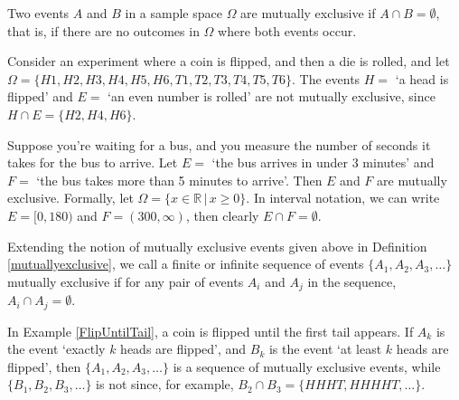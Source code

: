 \begin{definition}\label{mutuallyexclusive}
Two events $A$ and $B$ in a sample space $\Omega$ are mutually exclusive if $A \cap B = \emptyset$, that is, if there are no outcomes in $\Omega$ where both events occur.
\end{definition}
\begin{examp}
Consider an experiment where a coin is flipped, and then a die is rolled, and let $\Omega = \{H1,H2,H3,H4,H5,H6,T1,T2,T3,T4,T5,T6\}$. The events $H =$ `a head is flipped' and $E =$ `an even number is rolled' are not mutually exclusive, since $H \cap E = \{H2, H4, H6\}$.
\end{examp}
\begin{examp}
Suppose you're waiting for a bus, and you measure the number of seconds it takes for the bus to arrive. Let $E =$ `the bus arrives in under 3 minutes' and $F =$ `the bus takes more than 5 minutes to arrive'. Then $E$ and $F$ are mutually exclusive. Formally, let $\Omega = \{ x \in \mathbb{R} \, | \, x \geq 0\}$. In interval notation, we can write $E = [0,180)$ and $F = (300,\infty)$, then clearly $E \cap F = \emptyset$.
\end{examp}
\par
Extending the notion of mutually exclusive events given above in Definition \ref{mutuallyexclusive}, we call a finite or infinite sequence of events $\{A_1, A_2, A_3, \dots\}$ mutually exclusive if for any pair of events $A_i$ and $A_j$ in the sequence, $A_i \cap A_j = \emptyset$.
\begin{examp}
In Example \ref{FlipUntilTail}, a coin is flipped until the first tail appears. If $A_k$ is the event `exactly $k$ heads are flipped', and $B_k$ is the event `at least $k$ heads are flipped', then $\{A_1, A_2, A_3, \dots\}$ is a sequence of mutually exclusive events, while $\{B_1, B_2, B_3, \dots\}$ is not since, for example, $B_2 \cap B_3 = \{HHHT, HHHHT, \dots\}$.
\end{examp}




